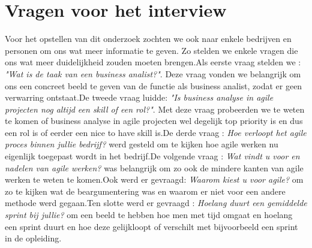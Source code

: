 \documentclass{hogent-article}
\begin{document}
	\section{Vragen voor het interview}
	Voor het opstellen van dit onderzoek zochten we ook naar enkele bedrijven en personen om ons wat meer informatie te geven. Zo stelden we enkele vragen die ons wat meer duidelijkheid zouden moeten brengen.\newline \newline Als eerste vraag stelden we : \textit{"Wat is de taak van een business analist?"}. Deze vraag vonden we belangrijk om ons een concreet beeld te geven van de functie als business analist, zodat er geen verwarring ontstaat.\newline\newline De tweede vraag luidde: \textit{"Is business analyse in agile projecten nog altijd een skill of een rol?"}. Met deze vraag probeerden we te weten te komen of business analyse in agile projecten wel degelijk top priority is en dus een rol is of eerder een nice to have skill is.\newline \newline De derde vraag : \textit{Hoe verloopt het agile proces binnen jullie bedrijf?} werd gesteld om te kijken hoe agile werken nu eigenlijk toegepast wordt in het bedrijf.\newline De volgende vraag : \textit{Wat vindt u voor en nadelen van agile werken?} was belangrijk om zo ook de mindere kanten van agile werken te weten te komen.\newline \newline Ook werd er gevraagd: \textit{Waarom kiest u voor agile?} om zo te kijken wat de beargumentering was en waarom er niet voor een andere methode werd gegaan.\newline  Ten slotte werd er gevraagd : \textit{Hoelang duurt een gemiddelde sprint bij jullie?} om een beeld te hebben hoe men met tijd omgaat en hoelang een sprint duurt en hoe deze gelijkloopt of verschilt met bijvoorbeeld een sprint in de opleiding.
	
	
	
\end{document}

